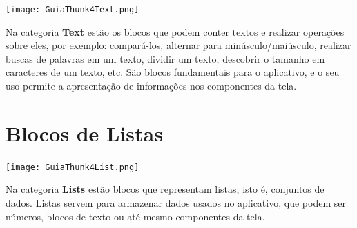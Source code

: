 \documentclass[11pt,fleqn]{book} %
\begin{document}
\begin{minipage}{0.45\textwidth}
	\texttt{[image: GuiaThunk4Text.png]}
\end{minipage}
\hfill
\begin{minipage}{0.5\textwidth}\raggedright
	Na categoria \textbf{Text} estão os blocos que podem conter textos e realizar operações sobre eles, por exemplo: compará-los, alternar para minúsculo/maiúsculo,
	realizar buscas de palavras em um texto, dividir um texto, descobrir o tamanho em caracteres de um texto, etc. São blocos fundamentais para o
	aplicativo, e o seu uso permite a apresentação de informações nos componentes da tela.
\end{minipage}


\section{Blocos de Listas}

\begin{minipage}{0.4\textwidth}
	\texttt{[image: GuiaThunk4List.png]}
\end{minipage}
\hfill
\begin{minipage}{0.5\textwidth}\raggedright
	Na categoria \textbf{Lists} estão blocos que representam listas, isto é, conjuntos de dados. Listas servem para armazenar dados usados no aplicativo, que podem ser números, blocos de texto ou até mesmo componentes da tela.
	
\end{minipage}


\end{document}
